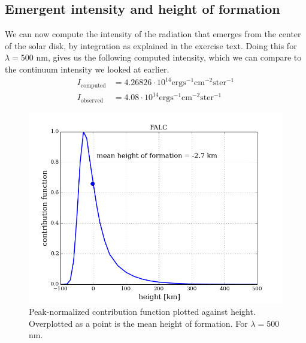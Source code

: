 \documentclass{article}
\begin{document}
\subsection{Emergent intensity and height of formation}
We can now compute the intensity of the radiation that emerges from the center of the solar disk, by integration as explained in the exercise text. Doing this for $\lambda = 500$ nm, gives us the following computed intensity, which we can compare to the continuum intensity we looked at earlier.
\begin{align*}
  I_{\text{computed}} &= 4.26826\cdot10^{14} \text{erg}\text{s}^{-1}\text{cm}^{-2}\text{ster}^{-1}\\
  I_{\text{observed}} &= 4.08\cdot10^{14} \text{erg}\text{s}^{-1}\text{cm}^{-2}\text{ster}^{-1}
\end{align*}
\begin{figure}[H]
  \centering
  \includegraphics[scale=0.5]{../figures/task2/emergent_intensity_1.png}
  \caption{Peak-normalized contribution function plotted against height. Overplotted as a point is the mean height of formation. For $\lambda=500$ nm.}
\end{figure}
\end{document}
